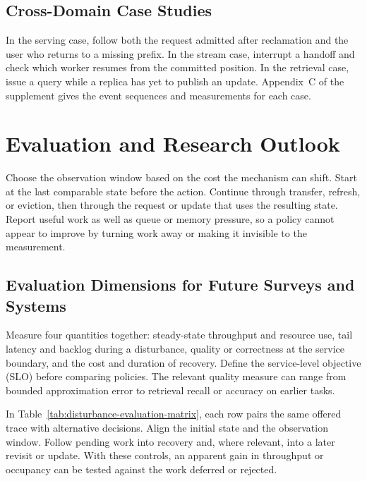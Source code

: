 \documentclass[manuscript]{acmart}
\begin{document}
\subsection{Cross-Domain Case Studies}

In the serving case, follow both the request admitted after reclamation and the user who returns to a missing prefix. In the stream case, interrupt a handoff and check which worker resumes from the committed position. In the retrieval case, issue a query while a replica has yet to publish an update. Appendix~C of the supplement gives the event sequences and measurements for each case.

\section{Evaluation and Research Outlook}
\label{sec:evaluation-outlook}

Choose the observation window based on the cost the mechanism can shift. Start at the last comparable state before the action. Continue through transfer, refresh, or eviction, then through the request or update that uses the resulting state. Report useful work as well as queue or memory pressure, so a policy cannot appear to improve by turning work away or making it invisible to the measurement.

\subsection{Evaluation Dimensions for Future Surveys and Systems}\label{sec:disturbance-evaluation}

Measure four quantities together: steady-state throughput and resource use, tail latency and backlog during a disturbance, quality or correctness at the service boundary, and the cost and duration of recovery. Define the service-level objective (SLO) before comparing policies. The relevant quality measure can range from bounded approximation error to retrieval recall or accuracy on earlier tasks.

In Table~\ref{tab:disturbance-evaluation-matrix}, each row pairs the same offered trace with alternative decisions. Align the initial state and the observation window. Follow pending work into recovery and, where relevant, into a later revisit or update. With these controls, an apparent gain in throughput or occupancy can be tested against the work deferred or rejected.
\end{document}
